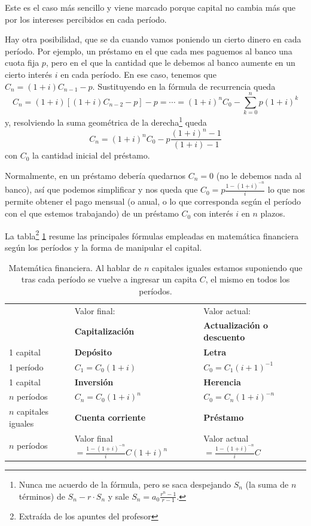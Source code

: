 \documentclass[nochap,palatino,shortheader]{apuntes}
\begin{document}
Este es el caso más sencillo y viene marcado porque capital no cambia más que por los intereses percibidos en cada período.

Hay otra posibilidad, que se da cuando vamos poniendo un cierto dinero en cada período. Por ejemplo, un préstamo en el que cada mes paguemos al banco una cuota fija $p$, pero en el que la cantidad que le debemos al banco aumente en un cierto interés $i$ en cada período. En ese caso, tenemos que $C_n = (1 + i) C_{n-1} - p$. Sustituyendo en la fórmula de recurrencia queda \[ C_n = (1 + i) \left[ (1+i) C_{n-2} - p\right] - p = \dotsb = (1+i)^nC_0 - \sum_{k = 0}^{n} p (1 + i)^k \] y, resolviendo la suma geométrica de la derecha\footnote{Nunca me acuerdo de la fórmula, pero se saca despejando $S_n$ (la suma de $n$ términos) de $S_n - r·S_n$ y sale $S_n = a_0 \frac{r^n - 1}{r-1}$.} queda \[ C_n = (1+i)^nC_0 - p\frac{(1+i)^{n} - 1}{(1+i) - 1}  \] con $C_0$ la cantidad inicial del préstamo.

Normalmente, en un préstamo debería quedarnos $C_n = 0$ (no le debemos nada al banco), así que podemos simplificar y nos queda que \( C_0 = p \frac{1 - (1 + i)^{-n}}{i} \label{eq:InteresCapVariable}\) lo que nos permite obtener el pago mensual (o anual, o lo que corresponda según el período con el que estemos trabajando) de un préstamo $C_0$ con interés $i$ en $n$ plazos.

La tabla\footnote{Extraída de los apuntes del profesor} \ref{tab:MatFinan} resume las principales fórmulas empleadas en matemática financiera según los períodos y la forma de manipular el capital.

\begin{table}[hbtp]
\centering
\begin{tabular}{l|p{6cm}|p{5cm}|}
& Valor final:  & Valor actual:  \\
& \textbf{Capitalización} & \textbf{Actualización o descuento} \\
\hline
1 capital & \textbf{Depósito} & \textbf{Letra}\\
1 período & $C_1=C_0(1+i)$ & $C_0=C_1(i+1)^{-1}$\\
\hline
1 capital & \textbf{Inversión} & \textbf{Herencia}\\
$n$ períodos & $C_n=C_0(1+i)^n$ & $C_0=C_n(1+i)^{-n}$ \\
\hline
$n$ capitales iguales & \textbf{Cuenta corriente} & \textbf{Préstamo}\\
$n$ períodos & Valor final$=\frac{1-(1+i)^{-n}}{i}C(1+i)^n$ & Valor actual$=\frac{1-(1+i)^{-n}}{i}C$ \\
\hline
\end{tabular}
\caption{Matemática financiera. Al hablar de $n$ capitales iguales estamos suponiendo que tras cada período se vuelve a ingresar un capita $C$, el mismo en todos los períodos.}
\label{tab:MatFinan}
\end{table}
\end{document}
